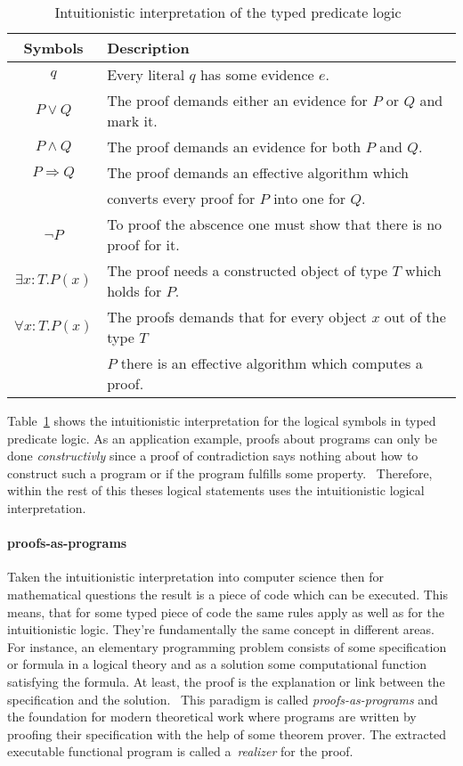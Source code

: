 \begin{table}[h]
  \centering
  \begin{tabular}{c|l}
    Symbols &  Description\\\hline
    $q$ & Every literal $q$ has some evidence $e$.\\
    $P\vee Q$ & The proof demands either an evidence for $P$ or $Q$ and mark it.\\
    $P\wedge Q$ & The proof demands an evidence for both $P$ and $Q$.\\
    $P\Rightarrow Q$ & The proof demands an effective algorithm which\\
           & converts every proof for $P$ into one for $Q$.\\
    $\neg P$ & To proof the abscence one must show that there is no proof for it.\\
    $\exists x:T.P(x)$ & The proof needs a constructed object of type $T$ which holds for $P$.\\
    $\forall x:T.P(x)$ & The proofs demands that for every object $x$ out of the type $T$\\
                 &  $P$ there is an effective algorithm which computes a proof.
  \end{tabular}
  \caption{Intuitionistic interpretation of the typed predicate logic~\cite{sep-mathematics-constructive}}
  \label{tab:intsymbols}
\end{table}

Table~\ref{tab:intsymbols} shows the intuitionistic interpretation for the logical
symbols in typed predicate logic. As an application example, proofs about
programs can only be done \textit{constructivly} since a proof of contradiction
says nothing about how to construct such a program or if the program
fulfills some property.~\cite{kreitz1994automatisierte}
Therefore, within the rest of this theses logical
statements uses the intuitionistic logical interpretation.

\paragraph{proofs-as-programs}
Taken the intuitionistic interpretation into computer science then for
mathematical questions the result is a piece of code which can be
executed. This means, that for some typed piece of code the same
rules apply as well as for the intuitionistic logic. They're
fundamentally the same concept in different areas.
For instance, an elementary programming problem consists of
some specification or formula in a logical theory and as a solution
some computational function satisfying the formula. At least, the
proof is the explanation or link between the specification and the
solution.~\cite{bates1985proofs}
This paradigm is called \textit{proofs-as-programs} and the foundation
for modern theoretical work where programs are written by proofing their
specification with the help of some theorem prover. The extracted executable
functional program is called a~\textit{realizer} for the proof.

